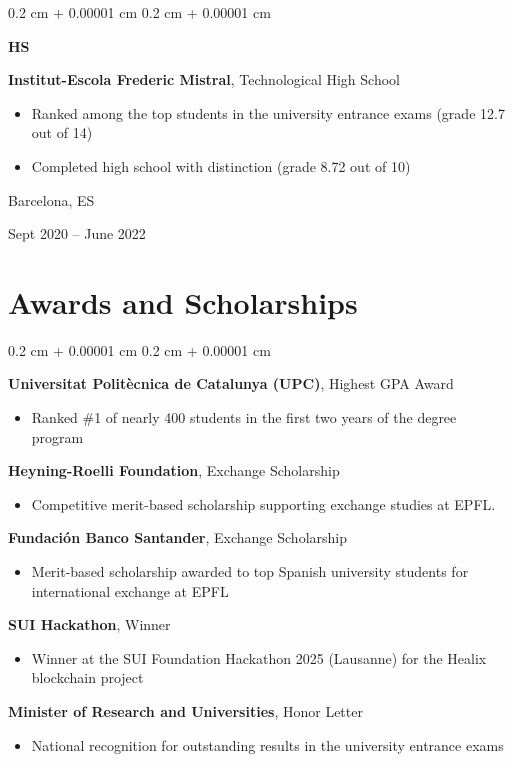 \documentclass[10pt, letterpaper]{article}
\newenvironment{highlights}{
    \begin{itemize}[
        topsep=0.10 cm,
        parsep=0.10 cm,
        partopsep=0pt,
        itemsep=0pt,
        leftmargin=0.4 cm + 10pt
    ]
}{
    \end{itemize}
} %
\newenvironment{onecolentry}{
    \begin{adjustwidth}{
        0.2 cm + 0.00001 cm
    }{
        0.2 cm + 0.00001 cm
    }
}{
    \end{adjustwidth}
} %
\newenvironment{threecolentry}[3][]{
    \onecolentry
    \def\thirdColumn{#3}
    \setcolumnwidth{1 cm, \fill, 4.5 cm}
    \begin{paracol}{3}
    {\raggedright #2} \switchcolumn
}{
    \switchcolumn \raggedleft \thirdColumn
    \end{paracol}
    \endonecolentry
} %
\begin{document}
        \vspace{0.2 cm}

        \begin{threecolentry}{\textbf{HS}}{
            Barcelona, ES
            
            Sept 2020 – June 2022
        }
            \textbf{Institut-Escola Frederic Mistral}, Technological High School
            \begin{highlights}
                \item Ranked among the top students in the university entrance exams (grade 12.7 out of 14)
                \item Completed high school with distinction (grade 8.72 out of 10)
            \end{highlights}
        \end{threecolentry}
        
    
    \section{Awards and Scholarships}
        \begin{onecolentry}
            \textbf{Universitat Politècnica de Catalunya (UPC)}, Highest GPA Award
            \begin{highlights}
                \item Ranked \#1 of nearly 400 students in the first two years of the degree program
            \end{highlights}
            
            \textbf{Heyning-Roelli Foundation}, Exchange Scholarship
            \begin{highlights}
                \item Competitive merit-based scholarship supporting exchange studies at EPFL.
            \end{highlights}
            
            \textbf{Fundación Banco Santander}, Exchange Scholarship
            \begin{highlights}
                \item Merit-based scholarship awarded to top Spanish university students for international exchange at EPFL
            \end{highlights}
            
            \textbf{SUI Hackathon}, Winner
            \begin{highlights}
                \item Winner at the SUI Foundation Hackathon 2025 (Lausanne) for the Healix blockchain project
            \end{highlights}
            
            \textbf{Minister of Research and Universities}, Honor Letter
            \begin{highlights}
                \item National recognition for outstanding results in the university entrance exams
            \end{highlights}
        \end{onecolentry}
\end{document}
